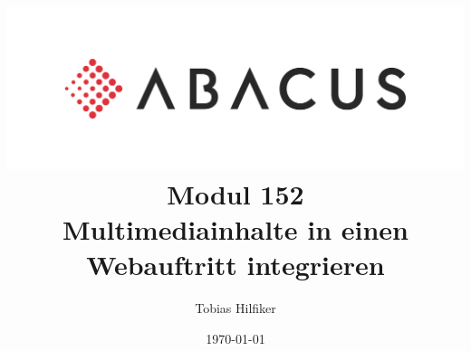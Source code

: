 \documentclass[11pt]{article}
\title{\includegraphics{media/frontpage.jpg}
Modul 152 \\
Multimediainhalte in einen Webauftritt integrieren}
\author{Tobias Hilfiker}
\date{\today}
\begin{document}
    \maketitle
    \pagebreak

    \tableofcontents
\end{document}
